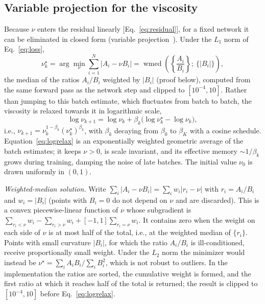 \documentclass[floatfix,aps,pra,twocolumn,showpacs,superscriptaddress,10pt,nofootinbib]{revtex4-2}
\newcommand{\wmed}{\operatorname{wmed}}
\begin{document}
\begin{appendices}
\subsection{Variable projection for the viscosity}\label{sec:varpro}
Because $\nu$ enters the residual linearly [Eq.~\eqref{eq:residual}], for a fixed network it can be eliminated in closed form (variable projection~\cite{golub1973differentiation}). Under the $L_1$ norm of Eq.~\eqref{eq:loss},
\begin{equation}
  \nu^\star_k=\arg\min_{\nu}\sum_{i=1}^N|A_i-\nu B_i|=\wmed\!\left(\left\{\frac{A_i}{B_i}\right\};\ \{|B_i|\}\right),
  \label{eq:wmed}
\end{equation}
the median of the ratios $A_i/B_i$ weighted by $|B_i|$ (proof below), computed from the same forward pass as the network step and clipped to $[10^{-4},10]$. Rather than jumping to this batch estimate, which fluctuates from batch to batch, the viscosity is relaxed towards it in logarithmic scale,
\begin{equation}
  \log\nu_{k+1}=\log\nu_k+\beta_k\big(\log\nu^\star_k-\log\nu_k\big),
  \label{eq:logrelax}
\end{equation}
i.e., $\nu_{k+1}=\nu_k^{1-\beta_k}(\nu^\star_k)^{\beta_k}$, with $\beta_k$ decaying from $\beta_0$ to $\beta_K$ with a cosine schedule. Equation~\eqref{eq:logrelax} is an exponentially weighted geometric average of the batch estimates; it keeps $\nu>0$, is scale invariant, and its effective memory $\sim1/\beta_k$ grows during training, damping the noise of late batches. The initial value $\nu_0$ is drawn uniformly in $(0,1)$.

\emph{Weighted-median solution.}
Write $\sum_i|A_i-\nu B_i|=\sum_iw_i|r_i-\nu|$ with $r_i=A_i/B_i$ and $w_i=|B_i|$ (points with $B_i=0$ do not depend on $\nu$ and are discarded). This is a convex piecewise-linear function of $\nu$ whose subgradient is $\sum_{r_i<\nu}w_i-\sum_{r_i>\nu}w_i+[-1,1]\sum_{r_i=\nu}w_i$. It contains zero when the weight on each side of $\nu$ is at most half of the total, i.e., at the weighted median of $\{r_i\}$. Points with small curvature $|B_i|$, for which the ratio $A_i/B_i$ is ill-conditioned, receive proportionally small weight. Under the $L_2$ norm the minimizer would instead be $\nu^\star=\sum_iA_iB_i/\sum_iB_i^2$, which is not robust to outliers. In the implementation the ratios are sorted, the cumulative weight is formed, and the first ratio at which it reaches half of the total is returned; the result is clipped to $[10^{-4},10]$ before Eq.~\eqref{eq:logrelax}.


\end{appendices}
\end{document}
